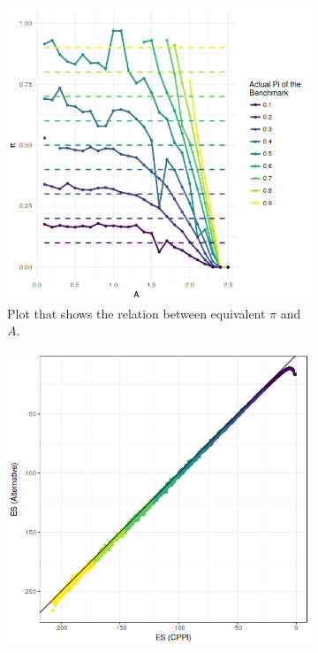 

\begin{figure}
\centering
\begin{subfigure}{.5\textwidth}
    \centering
    \includegraphics[scale=0.5]{./images/pi-A-all-pis.png}
    \caption{Plot that shows the relation between equivalent $\pi$ and $A$.}
    \label{fig:pi-A_all-pis2}
\end{subfigure}%
\begin{subfigure}{.5\textwidth}
    \centering
    \includegraphics[scale=0.5]{./images/es-es_pi.png}

\end{subfigure}
\end{figure}
